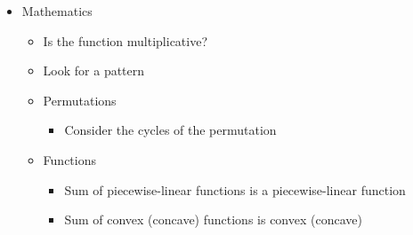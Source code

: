 \documentclass[9pt,a4paper,twocolumn,landscape,oneside]{amsart}
\newenvironment{myitemize}
{ \begin{itemize}[leftmargin=.5cm]
    \setlength{\itemsep}{0pt}
    \setlength{\parskip}{0pt}
    \setlength{\parsep}{0pt}     }
{ \end{itemize}                  }
\begin{document}
\begin{multicols*}{3}
\begin{myitemize}
\begin{itemize}
                        \item Eulerian path/circuit
                        \item Chinese postman problem
                        \item Topological sort
                        \item (Min-Cost) Max Flow
                        \item Min Cut
                            \begin{itemize}
                                \item Maximum Density Subgraph
                            \end{itemize}
                        \item Huffman Coding
                        \item Min-Cost Arborescence
                        \item Steiner Tree
                        \item Kirchoff's matrix tree theorem
                        \item Pr\"ufer sequences
                        \item Lov\'asz Toggle
                        \item Look at the DFS tree (which has no cross-edges)
                    \end{itemize}
                \item Mathematics
                    \begin{itemize}
                        \item Is the function multiplicative?
                        \item Look for a pattern
                        \item Permutations
                            \begin{itemize}
                                \item Consider the cycles of the permutation
                            \end{itemize}
                        \item Functions
                            \begin{itemize}
                                \item Sum of piecewise-linear functions is a piecewise-linear function
                                \item Sum of convex (concave) functions is convex (concave)
                            \end{itemize}

\end{itemize}
\end{myitemize}
\end{multicols*}
\end{document}

